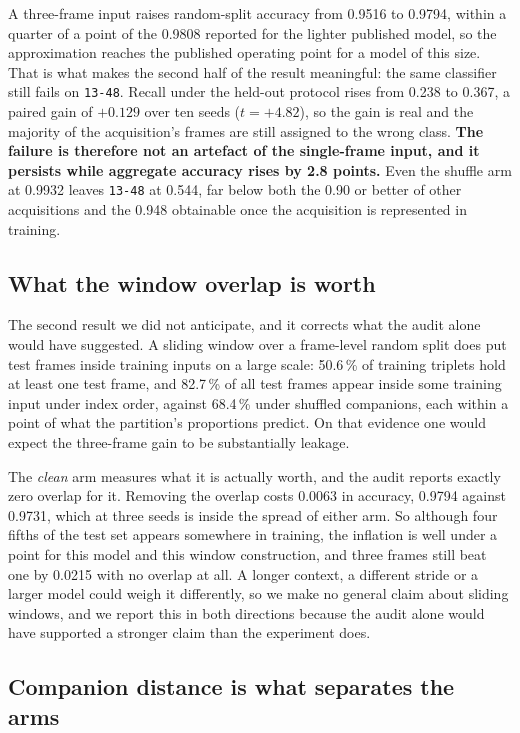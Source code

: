 \documentclass[11pt,a4paper]{article}
\newcommand{\s}[1]{\texttt{#1}}            %
\newcommand{\tgt}{\s{13-48}}               %
\begin{document}
A three-frame input raises random-split accuracy from 0.9516 to 0.9794, within a quarter of a point of the 0.9808 reported for the lighter published model, so the approximation reaches the published operating point for a model of this size. That is what makes the second half of the result meaningful: the same classifier still fails on \tgt. Recall under the held-out protocol rises from 0.238 to 0.367, a paired gain of $+0.129$ over ten seeds ($t = +4.82$), so the gain is real and the majority of the acquisition's frames are still assigned to the wrong class. \textbf{The failure is therefore not an artefact of the single-frame input, and it persists while aggregate accuracy rises by 2.8 points.} Even the shuffle arm at 0.9932 leaves \tgt{} at 0.544, far below both the 0.90 or better of other acquisitions and the 0.948 obtainable once the acquisition is represented in training.

\subsection{What the window overlap is worth}

The second result we did not anticipate, and it corrects what the audit alone would have suggested. A sliding window over a frame-level random split does put test frames inside training inputs on a large scale: 50.6\,\% of training triplets hold at least one test frame, and 82.7\,\% of all test frames appear inside some training input under index order, against 68.4\,\% under shuffled companions, each within a point of what the partition's proportions predict. On that evidence one would expect the three-frame gain to be substantially leakage.

The \emph{clean} arm measures what it is actually worth, and the audit reports exactly zero overlap for it. Removing the overlap costs 0.0063 in accuracy, 0.9794 against 0.9731, which at three seeds is inside the spread of either arm. So although four fifths of the test set appears somewhere in training, the inflation is well under a point for this model and this window construction, and three frames still beat one by 0.0215 with no overlap at all. A longer context, a different stride or a larger model could weigh it differently, so we make no general claim about sliding windows, and we report this in both directions because the audit alone would have supported a stronger claim than the experiment does.

\subsection{Companion distance is what separates the arms}
\end{document}
